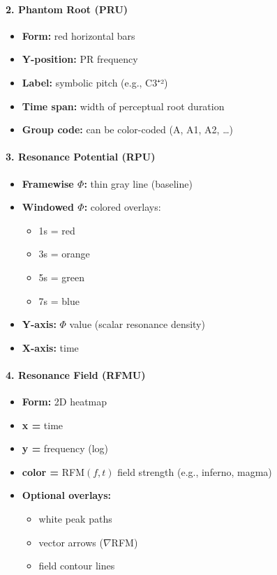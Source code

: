 \documentclass{article}
\begin{document}
\paragraph{2. Phantom Root (PRU)}

\begin{itemize}
    \item \textbf{Form:} red horizontal bars
    \item \textbf{Y-position:} PR frequency
    \item \textbf{Label:} symbolic pitch (e.g., C3⁺²)
    \item \textbf{Time span:} width of perceptual root duration
    \item \textbf{Group code:} can be color-coded (A, A1, A2, …)
\end{itemize}

\paragraph{3. Resonance Potential (RPU)}

\begin{itemize}
    \item \textbf{Framewise $\Phi$:} thin gray line (baseline)
    \item \textbf{Windowed $\Phi$:} colored overlays:
    \begin{itemize}
        \item 1s = red
        \item 3s = orange
        \item 5s = green
        \item 7s = blue
    \end{itemize}
    \item \textbf{Y-axis:} $\Phi$ value (scalar resonance density)
    \item \textbf{X-axis:} time
\end{itemize}

\paragraph{4. Resonance Field (RFMU)}

\begin{itemize}
    \item \textbf{Form:} 2D heatmap
    \item \textbf{x =} time
    \item \textbf{y =} frequency (log)
    \item \textbf{color =} RFM$(f, t)$ field strength (e.g., inferno, magma)
    \item \textbf{Optional overlays:}
    \begin{itemize}
        \item white peak paths
        \item vector arrows ($\nabla$RFM)
        \item field contour lines
    \end{itemize}
\end{itemize}
\end{document}
